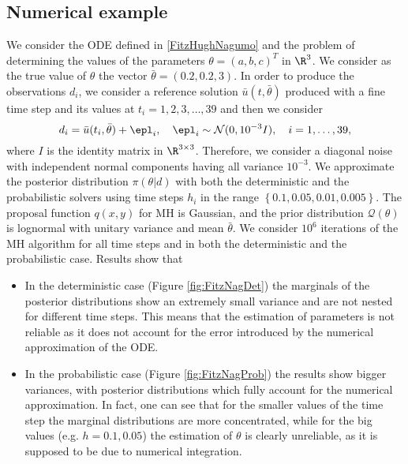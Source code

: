 

\subsection{Numerical example}
We consider the ODE defined in \eqref{FitzHughNagumo} and the problem of determining the values of the parameters $\theta = (a, b, c)^T$ in $\R^3$. We consider as the true value of $\theta$ the vector $\bar \theta = (0.2, 0.2, 3)$. In order to produce the observations $d_i$, we consider a reference solution $\bar u(t,\bar \theta)$ produced with a fine time step and its values at $t_i = 1, 2, 3, \ldots, 39$ and then we consider
\begin{equation}
	d_i = \bar u(t_i, \bar \theta) + \epl_i, \quad \epl_i \sim \mathcal N (0, 10^{-3}I), \quad i = 1, \ldots, 39,
\end{equation}
where $I$ is the identity matrix in $\R^{3\times3}$. Therefore, we consider a diagonal noise with independent normal components having all variance $10^{-3}$. We approximate the posterior distribution $\pi(\theta|d)$ with both the deterministic and the probabilistic solvers using time steps $h_i$ in the range $\left\{0.1, 0.05, 0.01, 0.005\right\}$. The proposal function $q(x,y)$ for MH is Gaussian, and the prior distribution $\mathcal{Q}(\theta)$ is lognormal with unitary variance and mean $\bar \theta$. We consider $10^6$ iterations of the MH algorithm for all time steps and in both the deterministic and the probabilistic case. Results show that
\begin{itemize}
	\item In the deterministic case (Figure \ref{fig:FitzNagDet}) the marginals of the posterior distributions show an extremely small variance and are not nested for different time steps. This means that the estimation of parameters is not reliable as it does not account for the error introduced by the numerical approximation of the ODE.
	\item In the probabilistic case (Figure \ref{fig:FitzNagProb}) the results show bigger variances, with posterior distributions which fully account for the numerical approximation. In fact, one can see that for the smaller values of the time step the marginal distributions are more concentrated, while for the big values (e.g. $h = 0.1, 0.05$) the estimation of $\theta$ is clearly unreliable, as it is supposed to be due to numerical integration.
\end{itemize}



